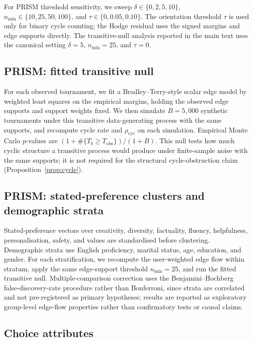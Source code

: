 \documentclass[10pt]{article}
\theoremstyle{definition}
\theoremstyle{remark}
\begin{document}
For PRISM threshold sensitivity, we sweep $\delta\in\{0,2,5,10\}$, $n_{\min}\in\{10,25,50,100\}$, and $\tau\in\{0,0.05,0.10\}$. The orientation threshold $\tau$ is used only for binary cycle counting; the Hodge residual uses the signed margins and edge supports directly. The transitive-null analysis reported in the main text uses the canonical setting $\delta=5$, $n_{\min}=25$, and $\tau=0$.

\subsection*{PRISM: fitted transitive null}

For each observed tournament, we fit a Bradley--Terry-style scalar edge model\cite{bradley1952} by weighted least squares on the empirical margins, holding the observed edge supports and support weights fixed. We then simulate $B=5{,}000$ synthetic tournaments under this transitive data-generating process with the same supports, and recompute cycle rate and $\rho_{\mathrm{cyc}}$ on each simulation. Empirical Monte Carlo $p$-values are $(1+\#\{T_b\geq T_{\mathrm{obs}}\})/(1+B)$. This null tests how much cyclic structure a transitive process would produce under finite-sample noise with the same supports; it is not required for the structural cycle-obstruction claim (Proposition~\ref{prop:cycle}).

\subsection*{PRISM: stated-preference clusters and demographic strata}

Stated-preference vectors over creativity, diversity, factuality, fluency, helpfulness, personalisation, safety, and values are standardised before clustering. Demographic strata use English proficiency, marital status, age, education, and gender. For each stratification, we recompute the user-weighted edge flow within stratum, apply the same edge-support threshold $n_{\min}=25$, and run the fitted transitive null. Multiple-comparison correction uses the Benjamini--Hochberg false-discovery-rate procedure\cite{benjamini1995} rather than Bonferroni, since strata are correlated and not pre-registered as primary hypotheses; results are reported as exploratory group-level edge-flow properties rather than confirmatory tests or causal claims.

\subsection*{Choice attributes}
\end{document}
